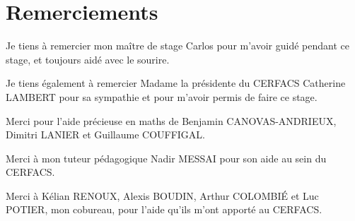 \chapter*{Remerciements}

Je tiens à remercier mon maître de stage Carlos pour m'avoir guidé pendant
ce stage, et toujours aidé avec le sourire.

Je tiens également à remercier Madame la présidente du CERFACS Catherine LAMBERT
pour sa sympathie et pour m'avoir permis de faire ce stage.

Merci pour l'aide précieuse en maths de Benjamin CANOVAS-ANDRIEUX,
Dimitri LANIER et Guillaume COUFFIGAL.

Merci à mon tuteur pédagogique Nadir MESSAI pour son aide au sein du CERFACS.

Merci à Kélian RENOUX, Alexis BOUDIN, Arthur COLOMBIÉ et Luc POTIER, mon
cobureau, pour l'aide qu'ils m'ont apporté au CERFACS.
